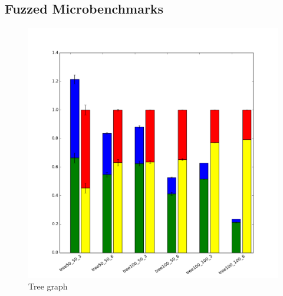\subsection{Fuzzed Microbenchmarks}
\begin{figure}
    \includegraphics[width=0.9\columnwidth]{figures/graphs/TreeGraph.png}
    \caption{Tree graph}
\end{figure}